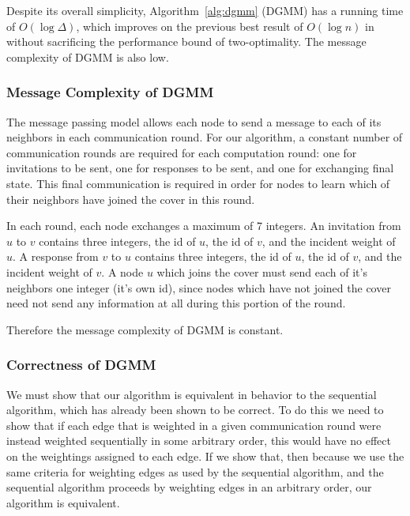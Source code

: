 \label{ssb:algorithms-dgmm-performance}

Despite its overall simplicity, Algorithm~\ref{alg:dgmm} (DGMM) has a running time of $O(\log \Delta)$, which improves on the previous best result of $O(\log n)$ in \cite{1582746} without sacrificing the performance bound of two-optimality. The message complexity of DGMM is also low.

\subsubsection{Message Complexity of DGMM}

The message passing model allows each node to send a message to each of its neighbors in each communication round. For our algorithm, a constant number of communication rounds are required for each computation round: one for invitations to be sent, one for responses to be sent, and one for exchanging final state. This final communication is required in order for nodes to learn which of their neighbors have joined the cover in this round.

In each round, each node exchanges a maximum of 7 integers. An invitation from $u$ to $v$ contains three integers, the id of $u$, the id of $v$, and the incident weight of $u$. A response from $v$ to $u$ contains three integers, the id of $u$, the id of $v$, and the incident weight of $v$. A node $u$ which joins the cover must send each of it's neighbors one integer (it's own id), since nodes which have not joined the cover need not send any information at all during this portion of the round.

Therefore the message complexity of DGMM is constant.

\subsubsection{Correctness of DGMM}

We must show that our algorithm is equivalent in behavior to the sequential algorithm, which has already been shown to be correct\cite{Gonzalez1995129}. To do this we need to show that if each edge that is weighted in a given communication round were instead weighted sequentially in some arbitrary order, this would have no effect on the weightings assigned to each edge. If we show that, then because we use the same criteria for weighting edges as used by the sequential algorithm, and the sequential algorithm proceeds by weighting edges in an arbitrary order, our algorithm is equivalent.

